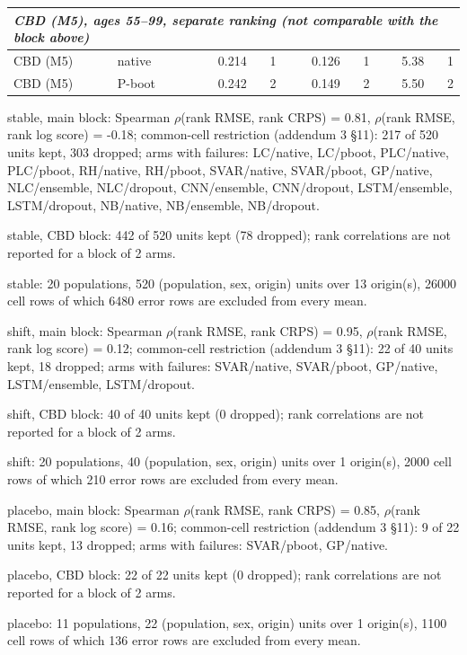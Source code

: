 {\begin{longtable}{@{}llrrrrrr@{}}
\multicolumn{8}{l}{\emph{CBD (M5), ages 55--99, separate ranking (not comparable with the block above)}} \\
\midrule
CBD (M5) & native & 0.214 & 1 & 0.126 & 1 & 5.38 & 1 \\
CBD (M5) & P-boot & 0.242 & 2 & 0.149 & 2 & 5.50 & 2 \\
\end{longtable}
\noindent\begin{minipage}{\linewidth}\scriptsize\raggedright
\noindent stable, main block: Spearman $\rho$(rank RMSE, rank CRPS) = 0.81, $\rho$(rank RMSE, rank log score) = -0.18; common-cell restriction (addendum 3 \S11): 217 of 520 units kept, 303 dropped; arms with failures: LC/native, LC/pboot, PLC/native, PLC/pboot, RH/native, RH/pboot, SVAR/native, SVAR/pboot, GP/native, NLC/ensemble, NLC/dropout, CNN/ensemble, CNN/dropout, LSTM/ensemble, LSTM/dropout, NB/native, NB/ensemble, NB/dropout.\par
\noindent stable, CBD block: 442 of 520 units kept (78 dropped); rank correlations are not reported for a block of 2 arms.\par
\noindent stable: 20 populations, 520 (population, sex, origin) units over 13 origin(s), 26000 cell rows of which 6480 error rows are excluded from every mean.\par
\noindent shift, main block: Spearman $\rho$(rank RMSE, rank CRPS) = 0.95, $\rho$(rank RMSE, rank log score) = 0.12; common-cell restriction (addendum 3 \S11): 22 of 40 units kept, 18 dropped; arms with failures: SVAR/native, SVAR/pboot, GP/native, LSTM/ensemble, LSTM/dropout.\par
\noindent shift, CBD block: 40 of 40 units kept (0 dropped); rank correlations are not reported for a block of 2 arms.\par
\noindent shift: 20 populations, 40 (population, sex, origin) units over 1 origin(s), 2000 cell rows of which 210 error rows are excluded from every mean.\par
\noindent placebo, main block: Spearman $\rho$(rank RMSE, rank CRPS) = 0.85, $\rho$(rank RMSE, rank log score) = 0.16; common-cell restriction (addendum 3 \S11): 9 of 22 units kept, 13 dropped; arms with failures: SVAR/pboot, GP/native.\par
\noindent placebo, CBD block: 22 of 22 units kept (0 dropped); rank correlations are not reported for a block of 2 arms.\par
\noindent placebo: 11 populations, 22 (population, sex, origin) units over 1 origin(s), 1100 cell rows of which 136 error rows are excluded from every mean.\par

\end{minipage}}
